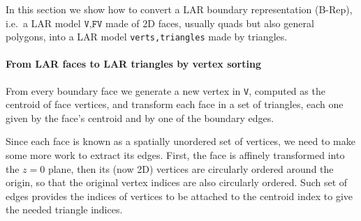 \documentclass[11pt,oneside]{article}	%
\begin{document}
In this section we show how to convert a LAR boundary representation (B-Rep), i.e.~a LAR model $\texttt{V,FV}$ made of 2D faces, usually quads but also general polygons, into a LAR model \texttt{verts,triangles} made by triangles.

\paragraph{From LAR faces to LAR triangles by vertex sorting}
From every boundary face we generate a new vertex in \texttt{V}, computed as the centroid of face vertices, and transform each face in a set of triangles, each one given by the face's centroid and by one of the boundary edges. 

Since each face is known as a spatially unordered set of vertices, we need to make some more work to extract its edges. First, the face is affinely transformed into the $z=0$ plane, then its (now 2D) vertices are circularly ordered around the origin, so that the original vertex indices are also circularly ordered. Such set of edges provides the indices of vertices to be attached to the centroid index to give the needed triangle indices.
\end{document}
